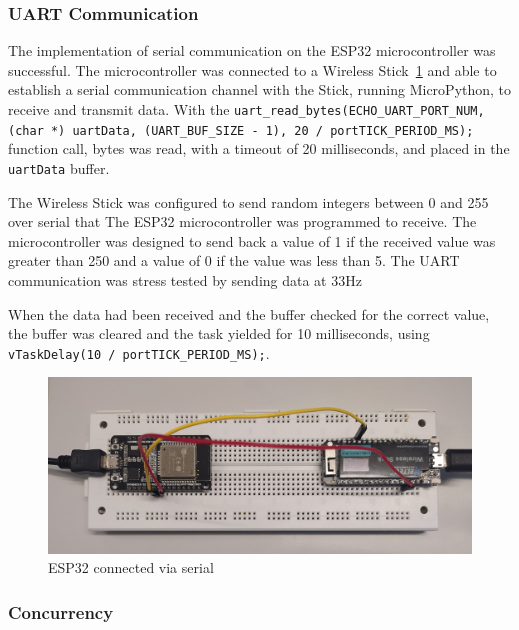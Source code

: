 \subsubsection{UART Communication}

The implementation of serial communication on the ESP32 microcontroller was successful. The microcontroller was connected to a Wireless Stick~\ref{fig:serial_connection} and able to establish a serial communication channel with the Stick, running MicroPython, to receive and transmit data. With the \texttt{uart\_read\_bytes(ECHO\_UART\_PORT\_NUM, (char *) uartData, (UART\_BUF\_SIZE - 1), 20 / portTICK\_PERIOD\_MS);} function call, bytes was read, with a timeout of 20 milliseconds, and placed in the \texttt{uartData} buffer. 

The Wireless Stick was configured to send random integers between 0 and 255 over serial that The ESP32 microcontroller was programmed to receive. The microcontroller was designed to send back a value of 1 if the received value was greater than 250 and a value of 0 if the value was less than 5. The UART communication was stress tested by sending data at 33Hz

When the data had been received and the buffer checked for the correct value, the buffer was cleared and the task yielded for 10 milliseconds, using \texttt{vTaskDelay(10 / portTICK\_PERIOD\_MS);}.

\begin{figure}[ht]
  \centering
  \includegraphics[width=0.8\linewidth]{figures/serial_connection.jpg}
  \caption{ESP32 connected via serial}
  \label{fig:serial_connection}
\end{figure}

\subsubsection{Concurrency}

